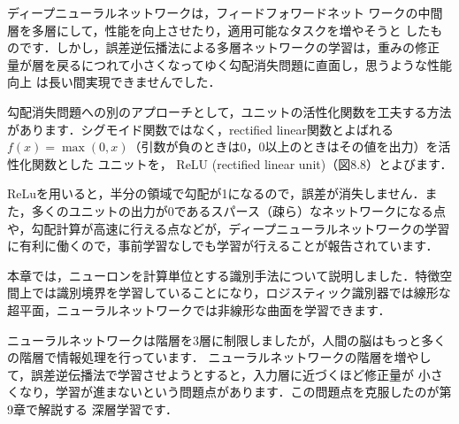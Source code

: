ディープニューラルネットワークは，フィードフォワードネット
ワークの中間層を多層にして，性能を向上させたり，適用可能なタスクを増やそうと
したものです．しかし，誤差逆伝播法による多層ネットワークの学習は，重みの修正
量が層を戻るにつれて小さくなってゆく勾配消失問題に直面し，思うような性能向上
は長い間実現できませんでした．




勾配消失問題への別のアプローチとして，ユニットの活性化関数を工夫する方法があります．シグモイド関数ではなく，rectified linear関数とよばれる$f(x)=\max(0,x)$（引数が負のときは0，0以上のときはその値を出力）を活性化関数とした ユニットを，
ReLU
(rectified linear unit)（図8.8）とよびます．


ReLuを用いると，半分の領域で勾配が1になるので，誤差が消失しません．また，多くのユニットの出力が0であるスパース（疎ら）なネットワークになる点や，勾配計算が高速に行える点などが，ディープニューラルネットワークの学習に有利に働くので，事前学習なしでも学習が行えることが報告されています．




本章では，ニューロンを計算単位とする識別手法について説明しました．特徴空間上では識別境界を学習していることになり，ロジスティック識別器では線形な超平面，ニューラルネットワークでは非線形な曲面を学習できます．

ニューラルネットワークは階層を3層に制限しましたが，人間の脳はもっと多くの階層で情報処理を行っています．
ニューラルネットワークの階層を増やして，誤差逆伝播法で学習させようとすると，入力層に近づくほど修正量が
小さくなり，学習が進まないという問題点があります．この問題点を克服したのが第9章で解説する
深層学習です．
